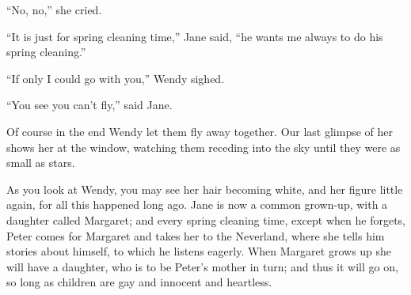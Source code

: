 “No, no,” she cried.

“It is just for spring cleaning time,” Jane said,
“he wants me always to do his spring cleaning.”

“If only I could go with you,” Wendy sighed.

“You see you can’t fly,” said Jane.

Of course in the end Wendy let them fly away together.
Our last glimpse of her shows her at the window,
watching them receding into the sky until they were as small as stars.

As you look at Wendy,
you may see her hair becoming white,
and her figure little again,
for all this happened long ago.
Jane is now a common grown-up,
with a daughter called Margaret;
and every spring cleaning time,
except when he forgets,
Peter comes for Margaret and takes her to the Neverland,
where she tells him stories about himself,
to which he listens eagerly.
When Margaret grows up she will have a daughter,
who is to be Peter’s mother in turn;
and thus it will go on,
so long as children are gay and innocent and heartless.

\endinput
